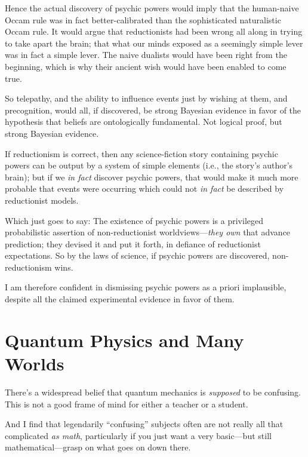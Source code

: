 {
 Hence the actual discovery of psychic powers would imply that the
human-naive Occam rule was in fact better-calibrated than the
sophisticated naturalistic Occam rule. It would argue that
reductionists had been wrong all along in trying to take apart the
brain; that what our minds exposed as a seemingly simple lever was in
fact a simple lever. The naive dualists would have been right from the
beginning, which is why their ancient wish would have been enabled to
come true.}

{
 So telepathy, and the ability to influence events just by wishing
at them, and precognition, would all, if discovered, be strong Bayesian
evidence in favor of the hypothesis that beliefs are ontologically
fundamental. Not logical proof, but strong Bayesian evidence.}

{
 If reductionism is correct, then any science-fiction story
containing psychic powers can be output by a system of simple elements
(i.e., the story's author's brain); but
if we \textit{in fact} discover psychic powers, that would make it much
more probable that events were occurring which could not \textit{in
fact} be described by reductionist models.}

{
 Which just goes to say: The existence of psychic powers is a
privileged probabilistic assertion of non-reductionist
worldviews---\textit{they own} that advance prediction; they devised it
and put it forth, in defiance of reductionist expectations. So by the
laws of science, if psychic powers are discovered, non-reductionism
wins.}

{
 I am therefore confident in dismissing psychic powers as a priori
implausible, despite all the claimed experimental evidence in favor of
them.}

\myendsectiontext

\chapter{Quantum Physics and Many Worlds}


{
 There's a widespread belief that quantum mechanics
is \textit{supposed} to be confusing. This is not a good frame of mind
for either a teacher or a student.}

{
 And I find that legendarily
``confusing'' subjects often are not
really all that complicated \textit{as math}, particularly if you just
want a very basic---but still mathematical---grasp on what goes on down
there.}

